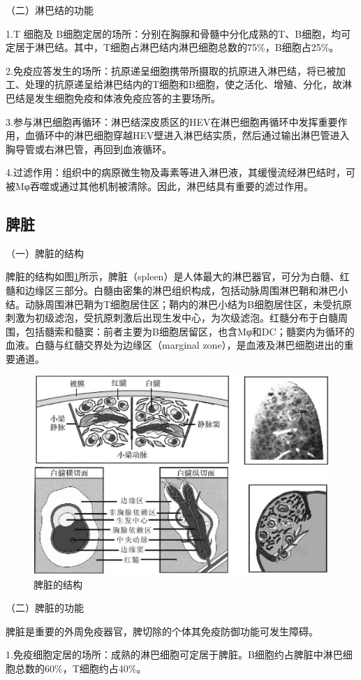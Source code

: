 （二）淋巴结的功能

1.T 细胞及
B细胞定居的场所：分别在胸腺和骨髓中分化成熟的T、B细胞，均可定居于淋巴结。其中，T细胞占淋巴结内淋巴细胞总数的75\%，B细胞占25\%。

2.免疫应答发生的场所：抗原递呈细胞携带所摄取的抗原进入淋巴结，将已被加工、处理的抗原递呈给淋巴结内的T细胞和B细胞，使之活化、增殖、分化，故淋巴结是发生细胞免疫和体液免疫应答的主要场所。

3.参与淋巴细胞再循环：淋巴结深皮质区的HEV在淋巴细胞再循环中发挥重要作用，血循环中的淋巴细胞穿越HEV壁进入淋巴结实质，然后通过输出淋巴管进入胸导管或右淋巴管，再回到血液循环。

4.过滤作用：组织中的病原微生物及毒素等进入淋巴液，其缓慢流经淋巴结时，可被Mφ吞噬或通过其他机制被清除。因此，淋巴结具有重要的滤过作用。


\subsection{脾脏}

（一）脾脏的结构

脾脏的结构如图\ref{fig2-9}所示，脾脏（spleen）是人体最大的淋巴器官，可分为白髓、红髓和边缘区三部分。白髓由密集的淋巴组织构成，包括动脉周围淋巴鞘和淋巴小结。动脉周围淋巴鞘为T细胞居住区；鞘内的淋巴小结为B细胞居住区，未受抗原刺激为初级滤泡，受抗原刺激后出现生发中心，为次级滤泡。红髓分布于白髓周围，包括髓索和髓窦：前者主要为B细胞居留区，也含Mφ和DC；髓窦内为循环的血液。白髓与红髓交界处为边缘区（marginal
zone），是血液及淋巴细胞进出的重要通道。

\begin{figure}[!htbp]
 \centering
 \includegraphics[width=.5\textwidth]{./images/Image00034.jpg}
 \caption{脾脏的结构}
 \label{fig2-9}
  \end{figure} 

（二）脾脏的功能

脾脏是重要的外周免疫器官，脾切除的个体其免疫防御功能可发生障碍。

1.免疫细胞定居的场所：成熟的淋巴细胞可定居于脾脏。B细胞约占脾脏中淋巴细胞总数的60\%，T细胞约占40\%。

